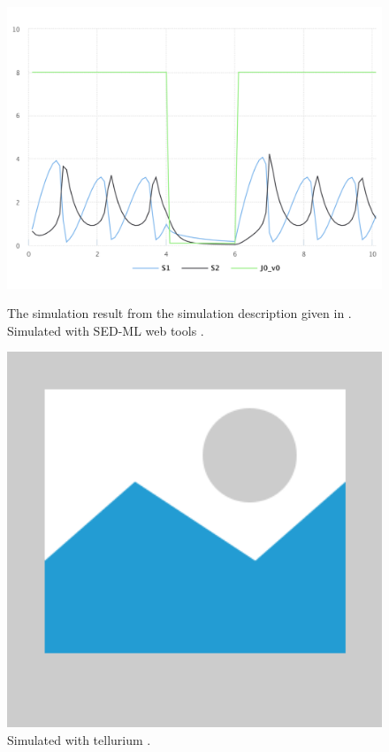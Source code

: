 \begin{figure}[ht]
    \centering
    \begin{minipage}{0.47\textwidth}
        \centering
        \includegraphics[width=1.0\textwidth]{examples/oscli-nested-pulse/results/sedml_webtools/plot1}
        \caption{The simulation result from the simulation description given in . Simulated with SED-ML web tools \citep{bergmann2017sed}.}
    \end{minipage}\hfill
    \begin{minipage}{0.47\textwidth}
        \centering
        \includegraphics[width=1.0\textwidth]{examples/placeholder}
        \caption{Simulated with tellurium \citep{tellurium}.}
    \end{minipage}
    \label{fig:oscli-nested-pulse}
\end{figure}

